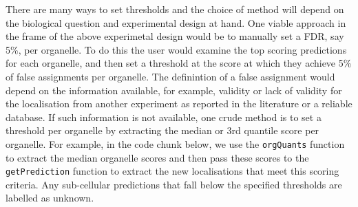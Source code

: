 There are many ways to set thresholds and the choice of method will
depend on the biological question and experimental design at hand. One
viable approach in the frame of the above experimetal design would be
to manually set a FDR, say 5\%, per organelle. To do this the user
would examine the top scoring predictions for each organelle, and then
set a threshold at the score at which they achieve 5\% of false
assignments per organelle.  The definintion of a false assignment
would depend on the information available, for example, validity or
lack of validity for the localisation from another experiment as
reported in the literature or a reliable database.  If such
information is not available, one crude method is to set a threshold
per organelle by extracting the median or 3rd quantile score per
organelle.  For example, in the code chunk below, we use the
\texttt{orgQuants} function to extract the median organelle scores and
then pass these scores to the \texttt{getPrediction} function to
extract the new localisations that meet this scoring criteria. Any
sub-cellular predictions that fall below the specified thresholds are
labelled as unknown.

